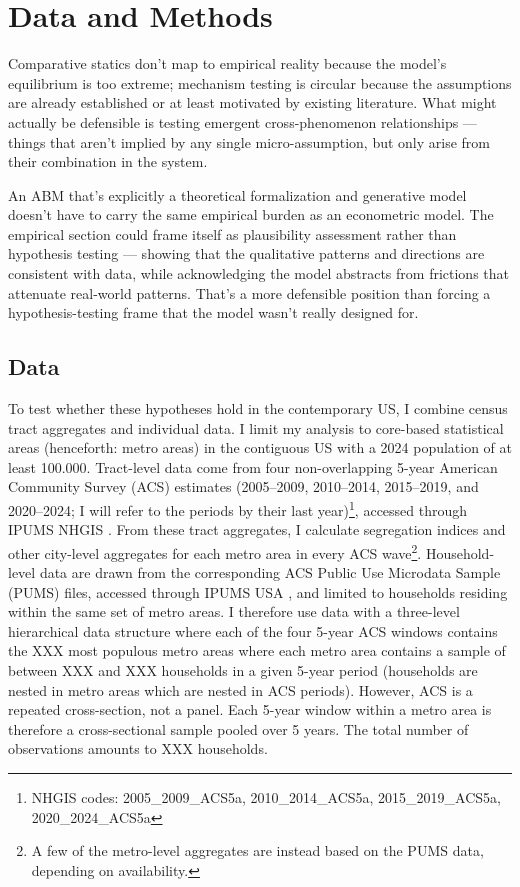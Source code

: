 \section{Data and Methods}

Comparative statics don't map to empirical reality because the model's equilibrium is too extreme; mechanism testing is circular because the assumptions are already established or at least motivated by existing literature. What might actually be defensible is testing emergent cross-phenomenon relationships — things that
  aren't implied by any single micro-assumption, but only arise from their combination in the system.

An ABM
  that's explicitly a theoretical formalization and generative model doesn't have to carry the same
  empirical burden as an econometric model. The empirical section could frame itself as plausibility
  assessment rather than hypothesis testing — showing that the qualitative patterns and directions
  are consistent with data, while acknowledging the model abstracts from frictions that attenuate
  real-world patterns. That's a more defensible position than forcing a hypothesis-testing frame that
   the model wasn't really designed for.


\subsection{Data}

To test whether these hypotheses hold in the contemporary US, I combine census tract aggregates and individual data. I limit my analysis to core-based statistical areas (henceforth: metro areas) in the contiguous US with a 2024 population of at least 100.000. Tract-level data come from four non-overlapping 5-year American Community Survey (ACS) estimates (2005–2009, 2010–2014, 2015–2019, and 2020–2024; I will refer to the periods by their last year)\footnote{NHGIS codes: 2005\_2009\_ACS5a, 2010\_2014\_ACS5a, 2015\_2019\_ACS5a, 2020\_2024\_ACS5a}, accessed through IPUMS NHGIS \citep{schroederNationalHistoricalGeographic2025}. From these tract aggregates, I calculate segregation indices and other city-level aggregates for each metro area in every ACS wave\footnote{A few of the metro-level aggregates are instead based on the PUMS data, depending on availability.}. Household-level data are drawn from the corresponding ACS Public Use Microdata Sample (PUMS) files, accessed through IPUMS USA \citep{rugglesIPUMSUSAVersion2025}, and limited to households residing within the same set of metro areas. I therefore use data with a three-level hierarchical data structure where each of the four 5-year ACS windows contains the XXX most populous metro areas where each metro area contains a sample of between XXX and XXX households in a given 5-year period (households are nested in metro areas which are nested in ACS periods). However, ACS is a repeated cross-section, not a panel. Each 5-year window within a metro area is therefore a cross-sectional sample pooled over 5 years. The total number of observations amounts to XXX households.

